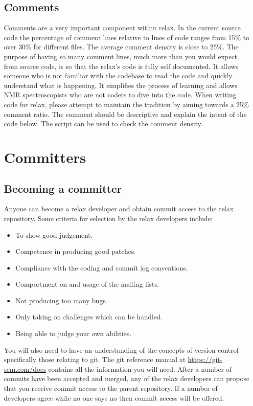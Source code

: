 \subsection{Comments}

Comments are a very important component within relax.
In the current source code the percentage of comment lines relative to lines of code ranges from 15\% to over 30\% for different files.
The average comment density is close to 25\%.
The purpose of having so many comment lines, much more than you would expect from source code, is so that the relax's code is fully self documented.
It allows someone who is not familiar with the codebase to read the code and quickly understand what is happening.
It simplifies the process of learning and allows NMR spectroscopists who are not coders to dive into the code.
When writing code for relax, please attempt to maintain the tradition by aiming towards a 25\% comment ratio.
The comment should be descriptive and explain the intent of the code below.
The script  can be used to check the comment density.




\section{Committers} \label{sect: committers}


\subsection{Becoming a committer}\label{becoming a committer}

Anyone can become a relax developer and obtain commit access to the relax repository.
Some criteria for selection by the relax developers include:
\begin{itemize}
    \item To show good judgement.
    \item Competence in producing good patches.
    \item Compliance with the coding and commit log conventions.
    \item Comportment on and usage of the mailing lists.
    \item Not producing too many bugs.
    \item Only taking on challenges which can be handled.
    \item Being able to judge your own abilities.
\end{itemize}
You will also need to have an understanding of the concepts of version control specifically those relating to git.
The git reference manual at \url{https://git-scm.com/docs} contains all the information you will need.
After a number of commits have been accepted and merged, any of the relax developers can propose that you receive commit access to the parent repository.
If a number of developers agree while no one says no then commit access will be offered.

